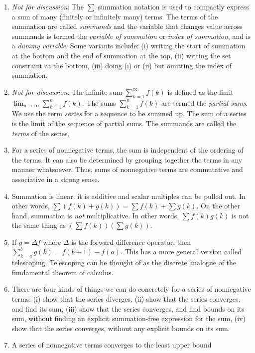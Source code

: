 \documentclass{amsart}
\begin{document}
\begin{enumerate}
\item {\em Not for discussion}: The $\sum$ summation notation is used
  to compactly express a sum of many (finitely or infinitely many)
  terms. The terms of the summation are called {\em summands} and the
  variable that changes value across summands is termed the {\em
  variable of summation} or {\em index of summation}, and is a {\em
  dummy variable}. Some variants include: (i) writing the start of
  summation at the bottom and the end of summation at the top, (ii)
  writing the set constraint at the bottom, (iii) doing (i) or (ii)
  but omitting the index of summation.
\item {\em Not for discussion}: The infinite sum $\sum_{k=1}^\infty
  f(k)$ is defined as the limit $\lim_{n \to \infty} \sum_{k=1}^n
  f(k)$. The sums $\sum_{k=1}^n f(k)$ are termed the {\em partial
  sums}. We use the term {\em series} for a sequence to be summed
  up. The sum of a series is the limit of the sequence of partial
  sums. The summands are called the {\em terms} of the series.
\item For a series of nonnegative terms, the sum is independent of the
  ordering of the terms. It can also be determined by grouping
  together the terms in any manner whatsoever. Thus, sums of
  nonnegative terms are commutative and associative in a strong sense.
\item Summation is linear: it is additive and scalar multiples can be
  pulled out. In other words, $\sum (f(k) + g(k)) = \sum f(k) + \sum
  g(k)$. On the other hand, summation is {\em not} multiplicative. In
  other words, $\sum f(k)g(k)$ is not the same thing as $(\sum
  f(k))(\sum g(k))$.
\item If $g = \Delta f$ where $\Delta$ is the forward difference
  operator, then $\sum_{k=a}^b g(k) = f(b + 1) - f(a)$. This has a
  more general version called telescoping. Telescoping can be thought
  of as the discrete analogue of the fundamental theorem of calculus.
\item There are four kinds of things we can do concretely for a series
  of nonnegative terms: (i) show that the series diverges, (ii) show
  that the series converges, and find its sum, (iii) show that the
  series converges, and find bounds on its sum, without finding an
  explicit summation-free expression for the sum, (iv) show that the
  series converges, without any explicit bounds on its sum.
\item A series of nonnegative terms converges to the least upper bound

\end{enumerate}
\end{document}

